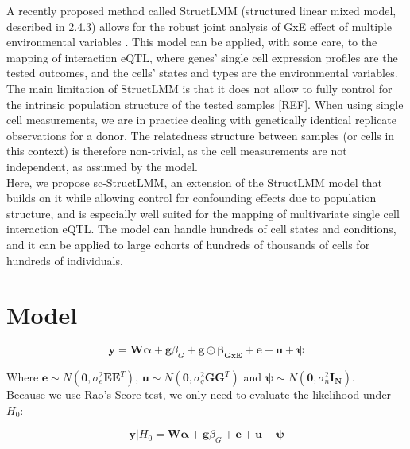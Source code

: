 A recently proposed method called StructLMM (structured linear mixed model, described in 2.4.3) allows for the robust joint analysis of GxE effect of multiple environmental variables \cite{moore2019linear}.
This model can be applied, with some care, to the mapping of interaction eQTL, where genes’ single cell expression profiles are the tested outcomes, and the cells’ states and types are the environmental variables. 
The main limitation of StructLMM is that it does not allow to fully control for the intrinsic population structure of the tested samples [REF]. 
When using single cell measurements, we are in practice dealing with genetically identical replicate observations for a donor. 
The relatedness structure between samples (or cells in this context) is therefore non-trivial, as the cell measurements are not independent, as assumed by the model.\\

Here, we propose sc-StructLMM, an extension of the StructLMM model that builds on it while allowing control for confounding effects due to population structure, and is especially well suited for the mapping of multivariate single cell interaction eQTL. 
The model can handle hundreds of cell states and conditions, and it can be applied to large cohorts of hundreds of thousands of cells for hundreds of  individuals.


\section{Model} 

\begin{equation}\label{eq:scStructLMM}
 \mathbf{y} =  \mathbf{W}\boldsymbol{\alpha} + \mathbf{g}\beta_G + \mathbf{g} \odot \boldsymbol{\beta_{GxE}} + \mathbf{e} + \mathbf{u} + \boldsymbol{\psi} 
\end{equation}

Where $\mathbf{e} \sim N(\mathbf{0},\sigma_e^2 \mathbf{E}\mathbf{E}^T)$, $\mathbf{u} \sim N(\mathbf{0},\sigma_g^2 \mathbf{G}\mathbf{G}^T)$ and $\boldsymbol{\psi} \sim N(\mathbf{0},\sigma_n^2 \mathbf{I_N})$.\\

Because we use Rao's Score test, we only need to evaluate the likelihood under $H_0$:

\begin{equation}\label{eq:scStructLMM_H0}
 \mathbf{y}|H_0 =  \mathbf{W}\boldsymbol{\alpha} + \mathbf{g}\beta_G + \mathbf{e} + \mathbf{u} + \boldsymbol{\psi} 
\end{equation}

